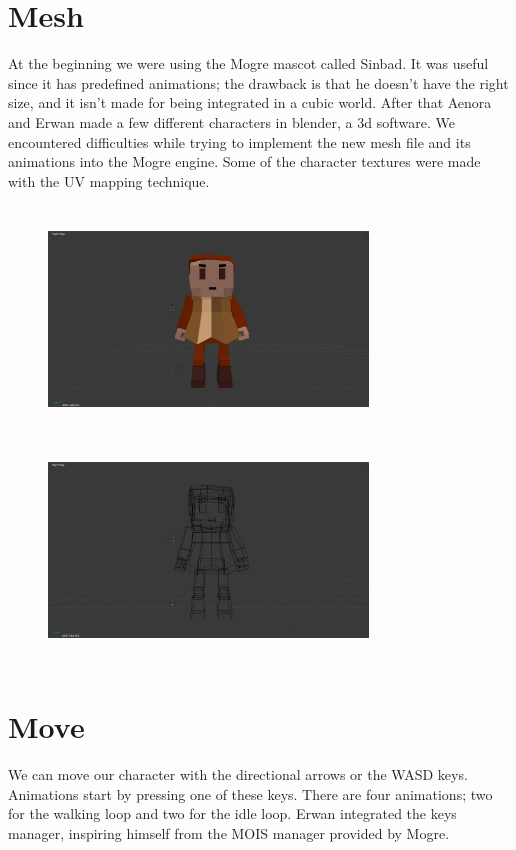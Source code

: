 \documentclass[article]{report} %
\begin{document}
			\section{Mesh}
				At the beginning we were using the \ac{Mogre} mascot called Sinbad. It was useful since it has predefined animations; the drawback is that he doesn't have the right size, and it isn't made for being integrated in a cubic world. After that Aenora and Erwan made a few different characters in blender, a 3d software. We encountered difficulties while trying to implement the new mesh file and its animations into the \ac{Mogre} engine. Some of the character textures were made with the UV mapping technique.
				\begin{figure}[h]
					\includegraphics[width=8.5cm,   height=6cm]{images/Ent/face_col.PNG}
					\includegraphics[width=8.5cm,   height=6cm]{images/Ent/face_wire_col.PNG}
				\end{figure}
			\section{Move}
				We can move our character with the directional arrows or the WASD keys. Animations start by pressing one of these keys. There are four animations; two for the walking loop and two for the idle loop. Erwan integrated the keys manager, inspiring himself from the MOIS manager provided by \ac{Mogre}.\\
\end{document}
